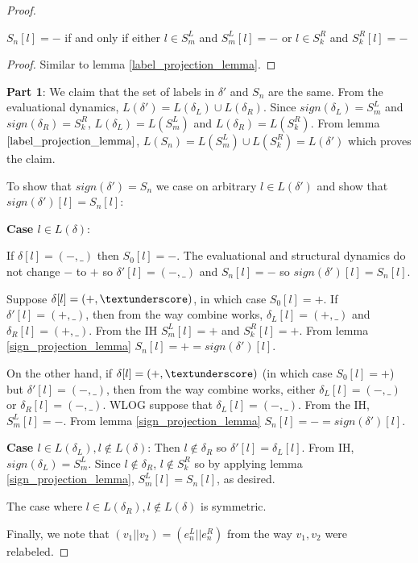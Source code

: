 \begin{proof}
\begin{lemma}
\label{sign_projection_lemma}
$S_n[l] = -$ if and only if either $l \in S^L_m$ and $S^L_m[l] = -$ or $l \in S^R_k$ and $S^R_k[l] = -$
\end{lemma}

\begin{proof}
Similar to lemma \ref{label_projection_lemma}.
\end{proof}

\textbf{Part 1}: We claim that the set of labels in $\delta'$ and $S_n$ are the same. From the evaluational dynamics, $L(\delta') = L(\delta_L) \cup L(\delta_R)$. Since $sign(\delta_L) = S^L_m$ and $sign(\delta_R) = S^R_k$, $L(\delta_L) = L(S^L_m)$ and $L(\delta_R) = L(S^R_k)$. From lemma $\ref{label_projection_lemma}$, $L(S_n) = L(S^L_m) \cup L(S^R_k) = L(\delta')$ which proves the claim. 

To show that $sign(\delta') = S_n$ we case on arbitrary $l \in L(\delta')$ and show that $sign(\delta')[l] = S_n[l]$:

\textbf{Case $l \in L(\delta)$}: 

If $\delta[l] = (-,\_)$ then $S_0[l] = -$. The evaluational and structural dynamics do not change $-$ to $+$ so $\delta'[l] = (-,\_)$ and $S_n[l] = -$ so $sign(\delta')[l] = S_n[l]$.

Suppose $\delta[l] = (+, \textunderscore)$, in which case $S_0[l] = +$. If $\delta'[l] = (+,\_)$, then from the way combine works, $\delta_L[l] = (+, \_)$ and $\delta_R[l] = (+, \_)$. From the IH $S^L_m[l] = +$ and $S^R_k[l] = +$. From lemma \ref{sign_projection_lemma} $S_n[l] = + = sign(\delta')[l]$. 

On the other hand, if $\delta[l] = (+, \textunderscore)$ (in which case $S_0[l] = +$) but $\delta'[l] = (-,\_)$, then from the way combine works, either $\delta_L[l] = (-,\_)$ or $\delta_R[l] = (-, \_)$. WLOG suppose that $\delta_L[l] = (-,\_)$. From the IH, $S^L_m[l] = -$. From lemma \ref{sign_projection_lemma} $S_n[l] = - = sign(\delta')[l]$.

\textbf{Case $l \in L(\delta_L), l \not\in L(\delta)$}: Then $l \not\in \delta_R$ so $\delta'[l] = \delta_L[l]$. From IH, $sign(\delta_L) = S^L_m$. Since $l \not\in \delta_R$, $l \not\in S^R_k$ so by applying lemma \ref{sign_projection_lemma}, $S^L_m[l] = S_n[l]$, as desired.

The case where $l \in L(\delta_R), l \not\in L(\delta)$ is symmetric.

Finally, we note that $(v_1||v_2) = (e^L_n||e^R_n)$ from the way $v_1,v_2$ were relabeled.


\end{proof}

